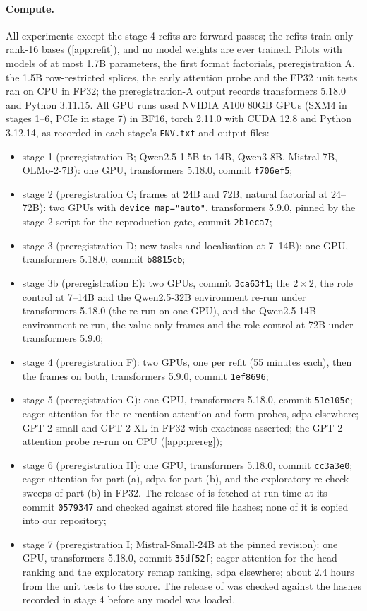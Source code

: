 \paragraph{Compute.} All experiments except the stage-4 refits are forward passes; the refits train only rank-16 bases (\cref{app:refit}), and no model weights are ever trained. Pilots with models of at most 1.7B parameters, the first format factorials, preregistration A, the 1.5B row-restricted splices, the early attention probe and the FP32 unit tests ran on CPU in FP32; the preregistration-A output records transformers 5.18.0 and Python 3.11.15. All GPU runs used NVIDIA A100 80GB GPUs (SXM4 in stages 1--6, PCIe in stage 7) in BF16, torch 2.11.0 with CUDA 12.8 and Python 3.12.14, as recorded in each stage's \texttt{ENV.txt} and output files:
\begin{itemize}\setlength\itemsep{1pt}
  \item stage 1 (preregistration B; Qwen2.5-1.5B to 14B, Qwen3-8B, Mistral-7B, OLMo-2-7B): one GPU, transformers 5.18.0, commit \texttt{f706ef5};
  \item stage 2 (preregistration C; frames at 24B and 72B, natural factorial at 24--72B): two GPUs with \texttt{device\_map="auto"}, transformers 5.9.0, pinned by the stage-2 script for the reproduction gate, commit \texttt{2b1eca7};
  \item stage 3 (preregistration D; new tasks and localisation at 7--14B): one GPU, transformers 5.18.0, commit \texttt{b8815cb};
  \item stage 3b (preregistration E): two GPUs, commit \texttt{3ca63f1}; the $2{\times}2$, the role control at 7--14B and the Qwen2.5-32B environment re-run under transformers 5.18.0 (the re-run on one GPU), and the Qwen2.5-14B environment re-run, the value-only frames and the role control at 72B under transformers 5.9.0;
  \item stage 4 (preregistration F): two GPUs, one per refit (55 minutes each), then the frames on both, transformers 5.9.0, commit \texttt{1ef8696};
  \item stage 5 (preregistration G): one GPU, transformers 5.18.0, commit \texttt{51e105e}; eager attention for the re-mention attention and form probes, sdpa elsewhere; GPT-2 small and GPT-2 XL in FP32 with exactness asserted; the GPT-2 attention probe re-run on CPU (\cref{app:prereg});
  \item stage 6 (preregistration H): one GPU, transformers 5.18.0, commit \texttt{cc3a3e0}; eager attention for part (a), sdpa for part (b), and the exploratory re-check sweeps of part (b) in FP32. The release of \citet{prakash2025lookbacks} is fetched at run time at its commit \texttt{0579347} and checked against stored file hashes; none of it is copied into our repository;
  \item stage 7 (preregistration I; Mistral-Small-24B at the pinned revision): one GPU, transformers 5.18.0, commit \texttt{35df52f}; eager attention for the head ranking and the exploratory remap ranking, sdpa elsewhere; about 2.4 hours from the unit tests to the score. The release of \citet{anonymous2026fitted} was checked against the hashes recorded in stage 4 before any model was loaded.
\end{itemize}

